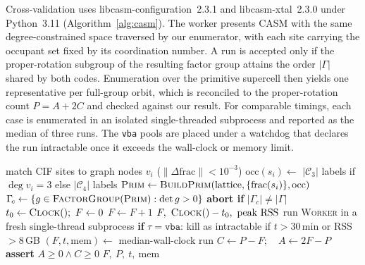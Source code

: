 \documentclass[pdflatex,sn-mathphys-num]{sn-jnl}
\theoremstyle{thmstyleone}%
\begin{document}
Cross-validation uses \textsf{libcasm-configuration}~2.3.1 and \textsf{libcasm-xtal}~2.3.0 under Python~3.11 (Algorithm~\ref{alg:casm}). The worker presents CASM with the same degree-constrained space traversed by our enumerator, with each site carrying the occupant set fixed by its coordination number. A run is accepted only if the proper-rotation subgroup of the resulting factor group attains the order $|\Gamma|$ shared by both codes. Enumeration over the primitive supercell then yields one representative per full-group orbit, which is reconciled to the proper-rotation count $P=A+2C$ and checked against our result. For comparable timings, each case is enumerated in an isolated single-threaded subprocess and reported as the median of three runs. The \texttt{vba} pools are placed under a watchdog that declares the run intractable once it exceeds the wall-clock or memory limit.

\begin{algorithm}[h]
\caption{CASM cross-validation for one (topology $\tau$, ligand pool)}
\label{alg:casm}
\begin{algorithmic}[1]
  \State match CIF sites to graph nodes $v_i$ ($\lVert\Delta\mathrm{frac}\rVert<10^{-3}$)
  \State $\mathrm{occ}(s_i)\gets$ $|\mathcal{C}_3|$ labels if $\deg v_i{=}3$ else $|\mathcal{C}_4|$ labels
  \State $\textsc{Prim}\gets\textsc{BuildPrim}(\text{lattice},\{\mathrm{frac}(s_i)\},\mathrm{occ})$
  \State $\Gamma_{\!c}\gets\{g\in\textsc{FactorGroup}(\textsc{Prim}):\det g>0\}$
  \State \textbf{abort if} $|\Gamma_{\!c}|\neq|\Gamma|$
  \State $t_0\gets\textsc{Clock}();\ F\gets 0$
    \State $F\gets F+1$
  \EndFor
  \State \Return $F,\ \textsc{Clock}()-t_0,\ \text{peak RSS}$
\EndProcedure
\Statex
{}
    \State run \textsc{Worker} in a fresh single-thread subprocess
    \State \textbf{if} $\tau=\texttt{vba}$: kill as intractable if $t>30$\,min or RSS$>8$\,GB
  \EndFor
  \State $(F,t,\text{mem})\gets$ median-wall-clock run
  \State $C\gets P-F;\quad A\gets 2F-P$
  \State \textbf{assert} $A\ge0\wedge C\ge0$
  \State \Return $F,\ P,\ t,\ \text{mem}$
\EndProcedure
\end{algorithmic}
\end{algorithm}
\end{document}
